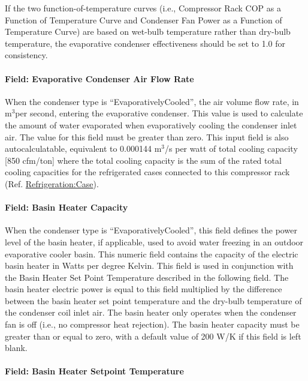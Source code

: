 If the two function-of-temperature curves (i.e., Compressor Rack COP as a Function of Temperature Curve and Condenser Fan Power as a Function of Temperature Curve) are based on wet-bulb temperature rather than dry-bulb temperature, the evaporative condenser effectiveness should be set to 1.0 for consistency.

\paragraph{Field: Evaporative Condenser Air Flow Rate}\label{field-evaporative-condenser-air-flow-rate-001}

When the condenser type is ``EvaporativelyCooled'', the air volume flow rate, in m\(^{3}\)per second, entering the evaporative condenser. This value is used to calculate the amount of water evaporated when evaporatively cooling the condenser inlet air. The value for this field must be greater than zero. This input field is also autocalculatable, equivalent to 0.000144 m\(^{3}\)/s per watt of total cooling capacity {[}850 cfm/ton{]} where the total cooling capacity is the sum of the rated total cooling capacities for the refrigerated cases connected to this compressor rack (Ref. \hyperref[refrigerationcase]{Refrigeration:Case}).

\paragraph{Field: Basin Heater Capacity}\label{field-basin-heater-capacity-003}

When the condenser type is ``EvaporativelyCooled'', this field defines the power level of the basin heater, if applicable, used to avoid water freezing in an outdoor evaporative cooler basin. This numeric field contains the capacity of the electric basin heater in Watts per degree Kelvin. This field is used in conjunction with the Basin Heater Set Point Temperature described in the following field. The basin heater electric power is equal to this field multiplied by the difference between the basin heater set point temperature and the dry-bulb temperature of the condenser coil inlet air. The basin heater only operates when the condenser fan is off (i.e., no compressor heat rejection). The basin heater capacity must be greater than or equal to zero, with a default value of 200 W/K if this field is left blank.

\paragraph{Field: Basin Heater Setpoint Temperature}\label{field-basin-heater-setpoint-temperature-003}

